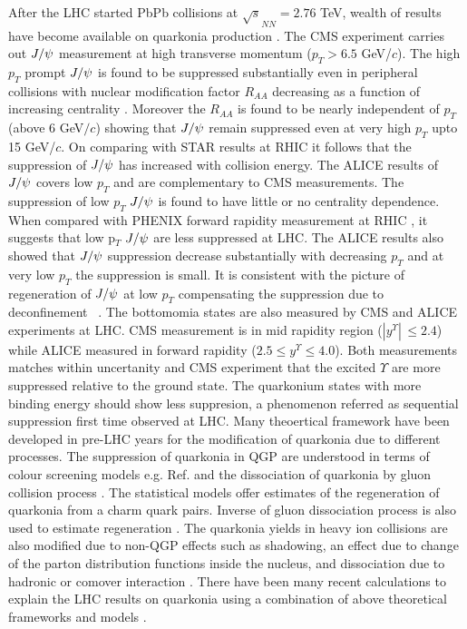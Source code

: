 \documentclass[aps,prc,preprint,superscriptaddress,showpacs,showkeys]{revtex4-1}
\begin{document}
  After the LHC started PbPb collisions at $\sqrt s_{NN} = 2.76$ TeV, wealth of
results have become available on quarkonia production \cite{QGP_Tc}. 
  The CMS experiment carries out $J/\psi$ measurement at high transverse momentum 
($p_T>6.5$ GeV/$c$). The high $p_T$ prompt $J/\psi$ is found to be suppressed substantially
even in peripheral collisions with nuclear modification factor $R_{AA}$ decreasing as a function 
of increasing centrality \cite{JCMS,CMSJPsi}. 
  Moreover the $R_{AA}$ is found to be nearly independent of $p_T$ (above 6 GeV$/c$) showing 
that $J/\psi$ remain suppressed even at very high $p_T$ upto 15 GeV/$c$.
 On comparing with STAR results \cite{STARjpsi} at RHIC it follows that the suppression of
 $J/\psi$ has increased with collision energy.
  The ALICE results \cite{ALICEJPsi} of $J/\psi$ covers low $p_T$ and are complementary 
to CMS measurements.
  The suppression of low $p_T$  $J/\psi$ is found to have little or no centrality 
dependence.  When compared with PHENIX forward rapidity measurement at 
RHIC \cite{PHENIXJPsi}, it suggests that low p$_T$ $J/\psi$ are less suppressed at LHC.
 The ALICE results also showed that $J/\psi$ suppression decrease substantially with 
decreasing $p_T$ and at very low $p_T$ the suppression is small.
 It is consistent with the picture of regeneration of $J/\psi$ at low $p_T$
compensating the suppression due to deconfinement ~\cite{ALICEJPsi}. 
The bottomomia states are also measured by CMS \cite{CMSUpsilon1,CMSUpsilon2} and
ALICE \cite{ALICEUpsilon} experiments at LHC. CMS measurement is in mid rapidity region
($|y^{\Upsilon}|\,\leq 2.4$) while ALICE measured in forward rapidity ($2.5 \leq y^{\Upsilon} \leq 4.0$).  
Both measurements matches within uncertanity and CMS experiment that the excited $\Upsilon$ 
are more suppressed relative to the ground state.
  The quarkonium states with more binding energy should show less suppresion, 
a phenomenon referred as sequential suppression first time observed at LHC.  
  Many theoertical framework have been developed in pre-LHC years for the modification of 
quarkonia due to different processes. 
 The suppression of quarkonia in QGP are understood in terms of colour screening models  
e.g. Ref. \cite{SATZ,YSuppAbdShuk} and the dissociation of quarkonia by gluon
collision process \cite{BhanotPeskin,Xu}. The statistical models \cite{Andronic_SH1,Andronic_SH2}
offer estimates of the regeneration of quarkonia from a charm quark pairs.
Inverse of gluon dissociation process is also used to estimate regeneration \cite{Grandchamp,Thews}.  
  The quarkonia yields in heavy ion collisions are also modified due to non-QGP effects such as
shadowing, an effect due to change of the parton distribution functions inside the nucleus,
and dissociation due to hadronic or comover interaction \cite{Vogt}.
 There have been many recent calculations to explain the LHC results on quarkonia using a 
combination of above theoretical frameworks and models \cite{Rapp1,Rapp2}. 
\end{document}
